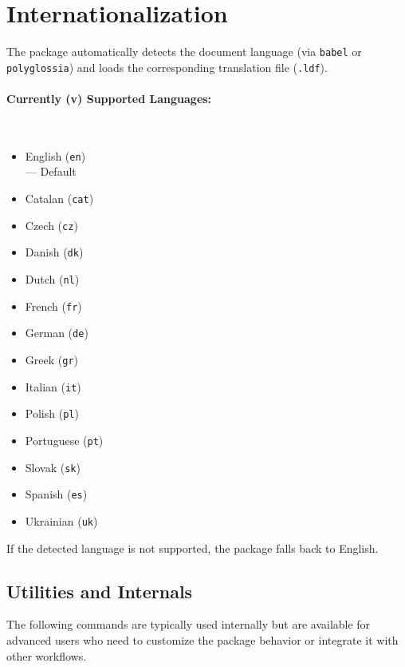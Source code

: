 \documentclass[11pt]{article}
\begin{document}
\section{Internationalization}
\label{sec:i18n}

The package automatically detects the document language (via \texttt{babel} or \texttt{polyglossia}) and loads the corresponding translation file (\texttt{.ldf}).
\paragraph{Currently (v\aidversion) Supported Languages:}~

\begin{itemize}[
    itemsep = 1\itemsep,
    parsep = 1\parsep,
    before = \raggedcolumns\begin{multicols}{3}\raggedright,
    after = \end{multicols}
  ]
    \item English (\texttt{en}) \\— Default
    \item Catalan (\texttt{cat})
    \item Czech (\texttt{cz})
    \item Danish (\texttt{dk})
    \item Dutch (\texttt{nl})
    \item French (\texttt{fr})
    \item German (\texttt{de})
    \item Greek (\texttt{gr})
    \item Italian (\texttt{it})
    \item Polish (\texttt{pl})
    \item Portuguese (\texttt{pt})
    \item Slovak (\texttt{sk})
    \item Spanish (\texttt{es})
    \item Ukrainian (\texttt{uk})
\end{itemize}

If the detected language is not supported, the package falls back to English.

\subsection{Utilities and Internals}

The following commands are typically used internally but are available for advanced users who need to customize the package behavior or integrate it with other workflows.
\end{document}
